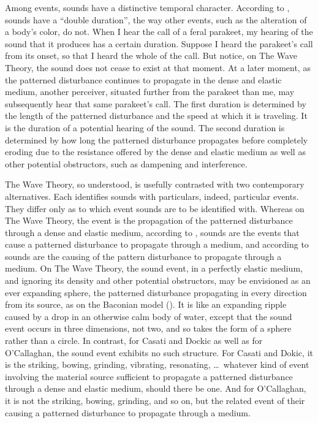 
Among events, sounds have a distinctive temporal character. According to \citet{OShaughnessy:2009aa}, sounds have a ``double duration'', the way other events, such as the alteration of a body's color, do not. When I hear the call of a feral parakeet, my hearing of the sound that it produces has a certain duration. Suppose I heard the parakeet's call from its onset, so that I heard the whole of the call. But notice, on The Wave Theory, the sound does not cease to exist at that moment. At a later moment, as the patterned disturbance continues to propagate in the dense and elastic medium, another perceiver, situated further from the parakeet than me, may subsequently hear that same parakeet's call. The first duration is determined by the length of the patterned disturbance and the speed at which it is traveling. It is the duration of a potential hearing of the sound. The second duration is determined by how long the patterned disturbance propagates before completely eroding due to the resistance offered by the dense and elastic medium as well as other potential obstructors, such as dampening and interference.

The Wave Theory, so understood, is usefully contrasted with two contemporary alternatives. Each identifies sounds with particulars, indeed, particular events. They differ only as to which event sounds are to be identified with. Whereas on The Wave Theory, the event is the propagation of the patterned disturbance through a dense and elastic medium, according to \citet{Casati:1994aa,Casati:2014hw}, sounds are the events that cause a patterned disturbance to propagate through a medium, and according to \citet{OCallaghan:2007xy,OCallaghan:2009aa} sounds are the causing of the pattern disturbance to propagate through a medium. On The Wave Theory, the sound event, in a perfectly elastic medium, and ignoring its density and other potential obstructors, may be envisioned as an ever expanding sphere, the patterned disturbance propagating in every direction from its source, as on the Baconian model (\citealt{Sorensen:2009aa}). It is like an expanding ripple caused by a drop in an otherwise calm body of water, except that the sound event occurs in three dimensions, not two, and so takes the form of a sphere rather than a circle. In contrast, for Casati and Dockic as well as for O'Callaghan, the sound event exhibits no such structure. For Casati and Dokic, it is the striking, bowing, grinding, vibrating, resonating, \ldots\ whatever kind of event involving the material source sufficient to propagate a patterned disturbance through a dense and elastic medium, should there be one. And for O'Callaghan, it is not the striking, bowing, grinding, and so on, but the related event of their causing a patterned disturbance to propagate through a medium. 


